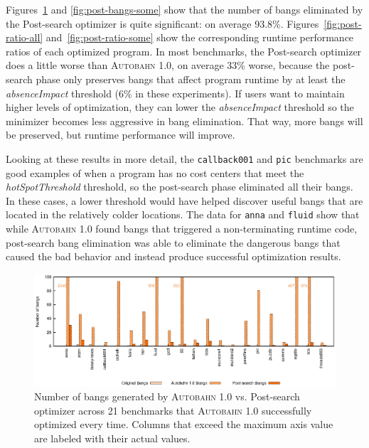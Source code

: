 \documentclass[format=sigplan, review=true, 9pt]{acmart}
\newcommand{\hotspotcost}[0]{\textit{hotSpotThreshold}}
\newcommand{\dangerous}[0]{dangerous}
\newcommand{\Ao}[0]{\textsc{Autobahn 1.0}}
\newcommand{\postopt}[0]{post-search}
\newcommand{\Postopt}[0]{Post-search}
\newcommand{\absim}[0]{\textit{absenceImpact}}
\newcommand{\nonterm}[0]{non-terminating}
\newcommand{\postBangs}[0]{93.8\%}
\newcommand{\postRatioWorse}[0]{33\%}
\begin{document}
Figures~\ref{fig:post-bangs-all} and \ref{fig:post-bangs-some} show
that the number of bangs eliminated by the \Postopt{} optimizer is quite
significant: on average \postBangs{}. Figures~\ref{fig:post-ratio-all}
and~\ref{fig:post-ratio-some} show the corresponding runtime
performance ratios of each optimized program. In most benchmarks,
the \Postopt{} optimizer does
a little worse than \Ao{}, on average \postRatioWorse{} worse, because 
the \postopt{} phase only preserves bangs that affect program
runtime by at least the \absim{} threshold (6\% in these experiments). 
If users want to
maintain higher levels of optimization,
they can lower the \absim{} threshold so the minimizer becomes less
aggressive in bang elimination. That way, more bangs will be
preserved, but runtime performance will
improve. 

Looking at these results in more detail, 
the \texttt{callback001} and \texttt{pic} benchmarks are good
examples of when a program has no cost centers that meet
the \hotspotcost{} threshold, so the \postopt{} phase eliminated all their bangs.
In these cases, a lower threshold would have
helped discover useful bangs that are located in the relatively colder locations.
The data for \texttt{anna} and \texttt{fluid}
show that while \Ao{} found bangs that triggered a \nonterm{} runtime
code, \postopt{} bang elimination was able to eliminate
the \dangerous{} bangs that caused the bad behavior and instead produce
successful optimization results.

\begin{figure}
\includegraphics[width=\textwidth]{aut-post-bangs}
\caption{Number of bangs generated by \Ao{} vs. \Postopt{} optimizer 
across 21 benchmarks that \Ao{} successfully optimized
every time. Columns that exceed the maximum axis value are labeled
with their actual values. }
\label{fig:post-bangs-all}
\end{figure}
\end{document}

